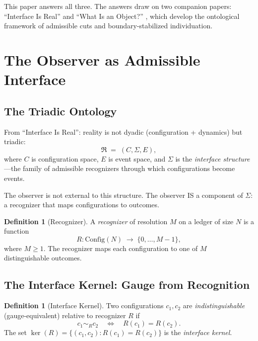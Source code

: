 \documentclass[11pt,a4paper]{article}
\theoremstyle{plain}
\theoremstyle{definition}
\newtheorem{definition}[theorem]{Definition}
\theoremstyle{remark}
\begin{document}
This paper answers all three.
The answers draw on two companion papers: ``Interface Is Real'' \cite{Washburn-Interface} and ``What Is an Object?'' \cite{Washburn-Object}, which develop the ontological framework of admissible cuts and boundary-stabilized individuation.

\section{The Observer as Admissible Interface}\label{sec:observer}

\subsection{The Triadic Ontology}

From ``Interface Is Real'': reality is not dyadic (configuration + dynamics) but triadic:
\[
\mathfrak{R} \;=\; (C, \Sigma, E),
\]
where $C$ is configuration space, $E$ is event space, and $\Sigma$ is the \emph{interface structure}---the family of admissible recognizers through which configurations become events.

The observer is not external to this structure.
The observer IS a component of $\Sigma$: a recognizer that maps configurations to outcomes.

\begin{definition}[Recognizer]\label{def:recognizer}
A \emph{recognizer} of resolution $M$ on a ledger of size $N$ is a function
\[
R : \mathrm{Config}(N) \;\to\; \{0,\ldots,M{-}1\},
\]
where $M \ge 1$.
The recognizer maps each configuration to one of $M$ distinguishable outcomes.
\end{definition}

\subsection{The Interface Kernel: Gauge from Recognition}

\begin{definition}[Interface Kernel]\label{def:kernel}
Two configurations $c_1, c_2$ are \emph{indistinguishable} (gauge-equivalent) relative to recognizer $R$ if
\[
c_1 \sim_R c_2 \quad\Longleftrightarrow\quad R(c_1) = R(c_2).
\]
The set $\ker(R) = \{(c_1, c_2) : R(c_1) = R(c_2)\}$ is the \emph{interface kernel}.
\end{definition}
\end{document}
